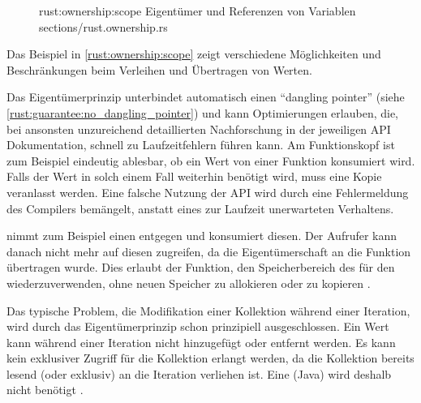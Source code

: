 \begin{figure}[H]
	\rustcinclude
		{rust:ownership:scope}
		{Eigentümer und Referenzen von Variablen}
		{sections/rust.ownership.rs}
\end{figure}

Das Beispiel in \autoref{rust:ownership:scope} zeigt verschiedene Möglichkeiten und Beschränkungen beim Verleihen und Übertragen von Werten.

Das Eigentümerprinzip unterbindet automatisch einen \enquote{dangling pointer} (siehe \autoref{rust:guarantee:no_dangling_pointer}) und kann Optimierungen erlauben, die, bei ansonsten unzureichend detaillierten Nachforschung in der jeweiligen API Dokumentation, schnell zu Laufzeitfehlern führen kann.
Am Funktionskopf ist zum Beispiel eindeutig ablesbar, ob ein Wert von einer Funktion konsumiert wird.
Falls der Wert in solch einem Fall weiterhin benötigt wird, muss eine Kopie veranlasst werden.
Eine falsche Nutzung der API wird durch eine Fehlermeldung des Compilers bemängelt, anstatt eines zur Laufzeit unerwarteten Verhaltens.

 nimmt zum Beispiel einen  entgegen und konsumiert diesen.
Der Aufrufer kann danach nicht mehr auf diesen zugreifen, da die Eigentümerschaft an die Funktion  übertragen wurde.
Dies erlaubt der Funktion, den Speicherbereich des  für den  wiederzuverwenden, ohne neuen Speicher zu allokieren oder zu kopieren \cite{rust:string:from_utf8}.

Das typische Problem, die Modifikation einer Kollektion während einer Iteration, wird durch das Eigentümerprinzip schon prinzipiell ausgeschlossen.
Ein Wert kann während einer Iteration nicht hinzugefügt oder entfernt werden.
Es kann kein exklusiver Zugriff für die Kollektion erlangt werden, da die Kollektion bereits lesend (oder exklusiv) an die Iteration verliehen ist.
Eine  (Java)  wird deshalb nicht benötigt \cite[116]{rust:orly_programming}.





